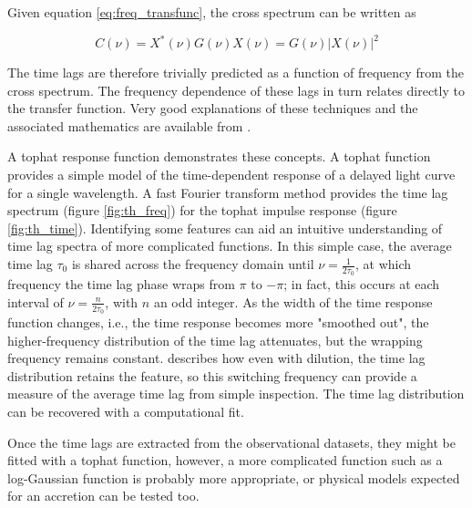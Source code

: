 \documentclass[11pt,letterpaper]{article}
\begin{document}
    Given equation \ref{eq:freq_transfunc}, the cross spectrum can be written as

    \begin{equation}
        C(\nu) = X^*(\nu) G(\nu) X(\nu) =  G(\nu) |X(\nu)|^2
    \end{equation}

    The time lags are therefore trivially predicted as a function of frequency from the cross spectrum. The frequency dependence of these lags in turn relates directly to the transfer function. Very good explanations of these techniques and the associated mathematics are available from \cite{2014A&ARv..22...72U}.

    A tophat response function demonstrates these concepts. A tophat function provides a simple model of the time-dependent response of a delayed light curve for a single wavelength. A fast Fourier transform method provides the time lag spectrum (figure \ref{fig:th_freq}) for the tophat impulse response (figure \ref{fig:th_time}). Identifying some features can aid an intuitive understanding of time lag spectra of more complicated functions. In this simple case, the average time lag $\tau_0$ is shared across the frequency domain until $\nu=\frac{1}{2\tau_0}$, at which frequency the time lag phase wraps from $\pi$ to $-\pi$; in fact, this occurs at each interval of $\nu=\frac{n}{2\tau_0}$, with $n$ an odd integer. As the width of the time response function changes, i.e., the time response becomes more "smoothed out", the higher-frequency distribution of the time lag attenuates, but the wrapping frequency remains constant. \cite{2014A&ARv..22...72U} describes how even with dilution, the time lag distribution retains the feature, so this switching frequency can provide a measure of the average time lag from simple inspection. The time lag distribution can be recovered with a computational fit.

    Once the time lags are extracted from the observational datasets, they might be fitted with a tophat function, however, a more complicated function such as a log-Gaussian function is probably more appropriate, or physical models expected for an accretion can be tested too.
\end{document}
